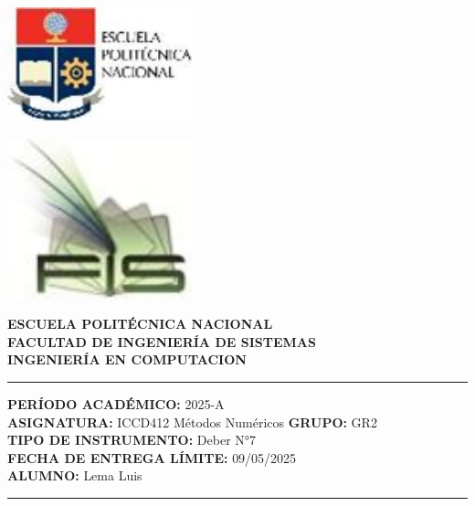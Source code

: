 \documentclass[12pt]{article}
\begin{document}
\begin{minipage}{0.45\textwidth}
    \includegraphics[width=0.4\textwidth]{inFiles/Figures/epnLogo.jpg}
\end{minipage}
\hfill
\begin{minipage}{0.45\textwidth}
    \raggedleft
    \includegraphics[width=0.4\textwidth]{inFiles/Figures/FIS_logo.jpg}
\end{minipage}

\vspace{0.5cm}

\begin{center}
    \textbf{ESCUELA POLITÉCNICA NACIONAL}\\[0.2cm]
    \textbf{FACULTAD DE INGENIERÍA DE SISTEMAS}\\[0.2cm]
    \textbf{INGENIERÍA {\textbf{EN COMPUTACION}}}
\end{center}

\vspace{0.5cm}
\hrule
\vspace{0.5cm}

\noindent\textbf{PERÍODO ACADÉMICO:} 2025-A\\[0.2cm]    
\noindent\textbf{ASIGNATURA:} ICCD412 Métodos Numéricos \hfill \textbf{GRUPO:} GR2\\[0.2cm]
\noindent\textbf{TIPO DE INSTRUMENTO:} {Deber N°7}\\[0.2cm]
\noindent\textbf{FECHA DE ENTREGA LÍMITE:} {09/05/2025}\\[0.2cm]
\noindent\textbf{ALUMNO:} {Lema Luis}

\vspace{0.5cm}
\hrule
\vspace{1cm}
\end{document}
